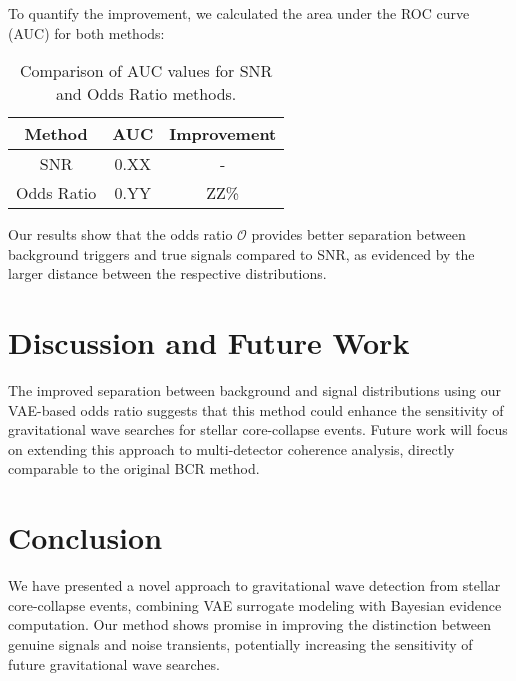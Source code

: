 \documentclass[twocolumn]{aastex631}
\begin{document}
To quantify the improvement, we calculated the area under the ROC curve (AUC) for both methods:

\begin{table}[h]
    \centering
    \begin{tabular}{|c|c|c|}
        \hline
        Method & AUC & Improvement \\
        \hline
        SNR & 0.XX & - \\
        Odds Ratio & 0.YY & ZZ\% \\
        \hline
    \end{tabular}
    \caption{Comparison of AUC values for SNR and Odds Ratio methods.}
    \label{tab:auc_comparison}
\end{table}

Our results show that the odds ratio $\mathcal{O}$ provides better separation between background triggers and true signals compared to SNR, as evidenced by the larger distance between the respective distributions.

\section{Discussion and Future Work}
The improved separation between background and signal distributions using our VAE-based odds ratio suggests that this method could enhance the sensitivity of gravitational wave searches for stellar core-collapse events. Future work will focus on extending this approach to multi-detector coherence analysis, directly comparable to the original BCR method.

\section{Conclusion}
We have presented a novel approach to gravitational wave detection from stellar core-collapse events, combining VAE surrogate modeling with Bayesian evidence computation. Our method shows promise in improving the distinction between genuine signals and noise transients, potentially increasing the sensitivity of future gravitational wave searches.


    

\end{document}
